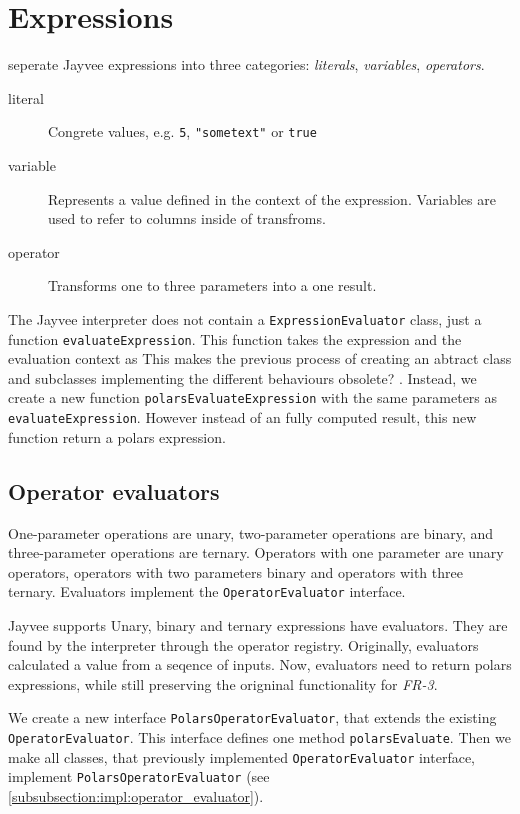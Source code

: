 \section{Expressions}
\label{section:expressions}
\textcite{polars:docs:expr} seperate Jayvee expressions into three categories: \emph{literals}, \emph{variables}, \emph{operators}.
\begin{description}
	\item[literal] Congrete values, e.g. \Verb|5|, \Verb|"sometext"| or \Verb|true|
	\item[variable] Represents a value defined in the context of the expression.
	      Variables are used to refer to columns inside of transfroms.
	\item[operator] Transforms one to three parameters into a one result.
\end{description}
The Jayvee interpreter does not contain a \Verb|ExpressionEvaluator| class, just a function \Verb|evaluateExpression|.
This function takes the expression and the evaluation context as
This makes the previous process of creating an abtract class and subclasses implementing the different behaviours obsolete? %
.
Instead, we create a new function \Verb|polarsEvaluateExpression| with the same parameters as \Verb|evaluateExpression|.
However instead of an fully computed result, this new function return a polars expression.

\subsection{Operator evaluators}
One-parameter operations are unary, two-parameter operations are binary, and three-parameter operations are ternary.
Operators with one parameter are unary operators, operators with two parameters binary and operators with three ternary.
Evaluators implement the \Verb|OperatorEvaluator| interface.

Jayvee supports Unary, binary and ternary expressions have evaluators.
They are found by the interpreter through the operator registry.
Originally, evaluators calculated a value from a seqence of inputs.
Now, evaluators need to return polars expressions, while still preserving the origninal functionality for \emph{FR-3}.

We create a new interface \Verb|PolarsOperatorEvaluator|, that extends the existing \Verb|OperatorEvaluator|.
This interface defines one method \Verb|polarsEvaluate|.
Then we make all classes, that previously implemented \Verb|OperatorEvaluator| interface, implement \Verb|PolarsOperatorEvaluator| (see \ref{subsubsection:impl:operator_evaluator}).

